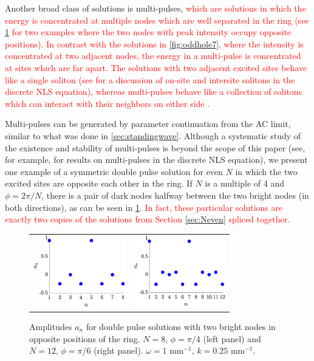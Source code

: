 \documentclass[reprint, amsmath,amssymb,aps,pra]{revtex4-2}
\renewcommand{\revised}[1]{ \textcolor{red}{#1} }
\begin{document}
Another broad class of solutions is multi-pulses, \revised{which are solutions in which the energy is concentrated at multiple nodes which are well separated in the ring (see \cref{fig:dp} for two examples where the two nodes with peak intensity occupy opposite positions). In contrast with the solutions in \cref{fig:oddhole7}, where the intensity is concentrated at two adjacent nodes, the energy in a multi-pulse is concentrated at sites which are far apart. The solutions with two adjacent excited sites behave like a single soliton (see \cite{Kevrekidis2009} for a discussion of on-site and intersite solitons in the discrete NLS equation), whereas multi-pulses behave like a collection of solitons which can interact with their neighbors on either side \cite{Parker2020}.}

Multi-pulses can be generated by parameter continuation from the AC limit, similar to what was done in \cref{sec:standingwave}. Although a systematic study of the existence and stability of multi-pulses is beyond the scope of this paper (see, for example, \cite{Parker2020} for results on multi-pulses in the discrete NLS equation), we present one example of a symmetric double pulse solution for even $N$ in which the two excited sites are opposite each other in the ring. If $N$ is a multiple of 4 and $\phi = 2\pi/N$, there is a pair of dark nodes halfway between the two bright nodes (in both directions), as can be seen in \cref{fig:dp}. \revised{In fact, these particular solutions are exactly two copies of the solutions from Section \ref{sec:Neven} spliced together.} 

\begin{figure}
\begin{center}
\begin{tabular}{cc}
\includegraphics[width=4cm]{dp8pi4} &
\includegraphics[width=4cm]{dp12pi6}
\end{tabular}
\end{center}
\caption{Amplitudes $a_n$ for double pulse solutions with two bright nodes in opposite positions of the ring. $N=8$, $\phi=\pi/4$ (left panel) and $N=12$, $\phi=\pi/6$ (right panel). $\omega = 1\text{ mm}^{-1}$, $k=0.25\text{ mm}^{-1}$.}
\label{fig:dp}
\end{figure}
\end{document}
